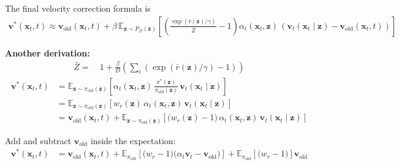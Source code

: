 \documentclass{article} %
\begin{document}
The final velocity correction formula is
\begin{align}
    \boxed{
        \mathbf{v}^*(\mathbf{x}_t, t)
        \approx
        \mathbf{v}_{\mathrm{old}}(\mathbf{x}_t, t)
        +
        \beta\,
        \mathbb{E}_{\mathbf{z} \sim P_{\mathcal{D}}(\mathbf{z})}
        \left[
            \left(
                \frac{\exp\!\left( \bar{r}(\mathbf{z})/\gamma \right)}{\bar{Z}}
                - 1
            \right)
            \alpha_t(\mathbf{x}_t, \mathbf{z})\,
            \left(
                \mathbf{v}_t(\mathbf{x}_t \mid \mathbf{z})
                -
                \mathbf{v}_{\mathrm{old}}(\mathbf{x}_t, t)
            \right)
        \right]
    }
\end{align}

\noindent\textbf{Another derivation:}
\begin{align}
    \bar{Z}=~&
    1 + \frac{\beta}{D}(\sum_i(\exp(\bar{r}(\mathbf{z})/\gamma)-1))
\end{align}
\begin{align}
    \mathbf{v}^*(\mathbf{x}_t, t)
    &=
    \mathbb{E}_{\mathbf{z} \sim \pi_{\mathrm{old}}(\mathbf{z})}
    \left[
        \alpha_t(\mathbf{x}_t, \mathbf{z})\,
        \frac{\pi^*(\mathbf{z})}{\pi_{\mathrm{old}}(\mathbf{z})}\,
        \mathbf{v}_t(\mathbf{x}_t \mid \mathbf{z})
    \right]
    \\
    &=
    \mathbb{E}_{\mathbf{z} \sim \pi_{\mathrm{old}}(\mathbf{z})}
    \left[
        w_r(\mathbf{z})\,
        \alpha_t(\mathbf{x}_t, \mathbf{z})\,
        \mathbf{v}_t(\mathbf{x}_t \mid \mathbf{z})
    \right]
    \\
    &=
    \mathbf{v}_{\mathrm{old}}(\mathbf{x}_t, t)
    +
    \mathbb{E}_{\mathbf{z} \sim \pi_{\mathrm{old}}(\mathbf{z})}
    \left[
        \bigl( w_r(\mathbf{z}) - 1 \bigr)\,
        \alpha_t(\mathbf{x}_t, \mathbf{z})\,
        \mathbf{v}_t(\mathbf{x}_t \mid \mathbf{z})
    \right]
\end{align}

Add and subtract $\mathbf{v}_{\mathrm{old}}$ inside the expectation:
\begin{align}
    \mathbf{v}^*(\mathbf{x}_t, t)
    &=
    \mathbf{v}_{\mathrm{old}}(\mathbf{x}_t, t)
    +
    \mathbb{E}_{\pi_{\mathrm{old}}}
    \left[
        \bigl( w_r - 1 \bigr)
        \bigl( \alpha_t \mathbf{v}_t - \mathbf{v}_{\mathrm{old}} \bigr)
    \right]
    +
    \mathbb{E}_{\pi_{\mathrm{old}}}
    \left[
        \bigl( w_r - 1 \bigr)
    \right]
    \mathbf{v}_{\mathrm{old}}
\end{align}
\end{document}
